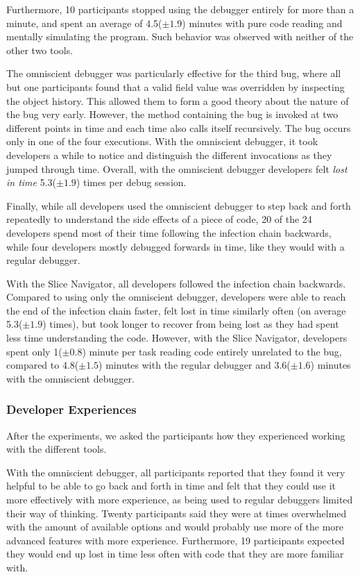 Furthermore, 10 participants stopped using the debugger entirely for more than a minute, and spent an average of 4.5($\pm1.9$) minutes with pure code reading and mentally simulating the program.
Such behavior was observed with neither of the other two tools.

The omniscient debugger was particularly effective for the third bug, where all but one participants found that a valid field value was overridden by inspecting the object history.
This allowed them to form a good theory about the nature of the bug very early.
However, the method containing the bug is invoked at two different points in time and each time also calls itself recursively.
The bug occurs only in one of the four executions.
With the omniscient debugger, it took developers a while to notice and distinguish the different invocations as they jumped through time.
Overall, with the omniscient debugger developers felt \emph{lost in time} 5.3($\pm1.9$) times per debug session.

Finally, while all developers used the omniscient debugger to step back and forth repeatedly to understand the side effects of a piece of code, 20 of the 24 developers spend most of their time following the infection chain backwards, while four developers mostly debugged forwards in time, like they would with a regular debugger.

With the Slice Navigator, all developers followed the infection chain backwards.
Compared to using only the omniscient debugger, developers were able to reach the end of the infection chain faster, felt lost in time similarly often (on average 5.3($\pm1.9$) times), but took longer to recover from being lost as they had spent less time understanding the code.
However, with the Slice Navigator, developers spent only 1($\pm0.8$) minute per task reading code entirely unrelated to the bug, compared to 4.8($\pm1.5$) minutes with the regular debugger and 3.6($\pm1.6$) minutes with the omniscient debugger.

\subsubsection{Developer Experiences}

After the experiments, we asked the participants how they experienced working with the different tools.

With the omniscient debugger, all participants reported that they found it very helpful to be able to go back and forth in time and felt that they could use it more effectively with more experience, as being used to regular debuggers limited their way of thinking.
Twenty participants said they were at times overwhelmed with the amount of available options and would probably use more of the more advanced features with more experience.
Furthermore, 19 participants expected they would end up lost in time less often with code that they are more familiar with.

